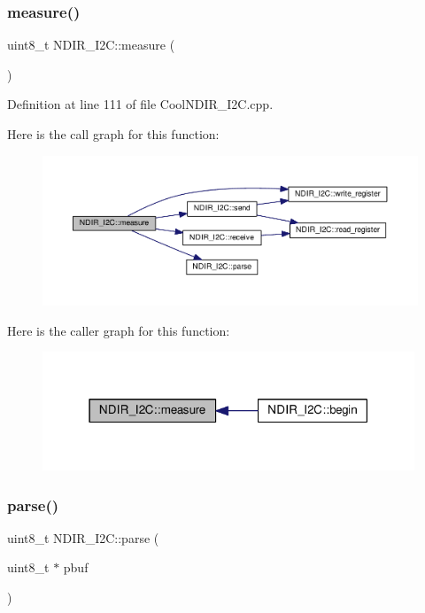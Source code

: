 \subsubsection{\texorpdfstring{measure()}{measure()}}
{\footnotesize\ttfamily uint8\+\_\+t N\+D\+I\+R\+\_\+\+I2\+C\+::measure (\begin{DoxyParamCaption}{ }\end{DoxyParamCaption})}



Definition at line 111 of file Cool\+N\+D\+I\+R\+\_\+\+I2\+C.\+cpp.

Here is the call graph for this function\+:
\nopagebreak
\begin{figure}[H]
\begin{center}
\leavevmode
\includegraphics[width=350pt]{class_n_d_i_r___i2_c_ab8f50d38501d498b802b822bd4844ede_cgraph}
\end{center}
\end{figure}
Here is the caller graph for this function\+:
\nopagebreak
\begin{figure}[H]
\begin{center}
\leavevmode
\includegraphics[width=315pt]{class_n_d_i_r___i2_c_ab8f50d38501d498b802b822bd4844ede_icgraph}
\end{center}
\end{figure}
\mbox{\label{class_n_d_i_r___i2_c_a907b756fc9244c7398b7d187b73cde94}} 
\subsubsection{\texorpdfstring{parse()}{parse()}}
{\footnotesize\ttfamily uint8\+\_\+t N\+D\+I\+R\+\_\+\+I2\+C\+::parse (\begin{DoxyParamCaption}\item[{uint8\+\_\+t $\ast$}]{pbuf }\end{DoxyParamCaption})\hspace{0.3cm}{\ttfamily [private]}}



